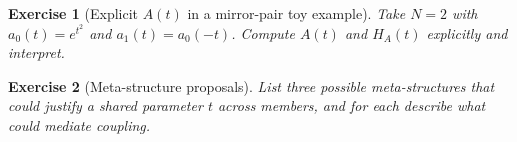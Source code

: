 \documentclass[11pt]{article}
\newtheorem{exercise}{Exercise}
\begin{document}
\begin{exercise}[Explicit $A(t)$ in a mirror-pair toy example]
Take $N=2$ with $a_0(t)=e^{t^2}$ and $a_1(t)=a_0(-t)$. Compute $A(t)$ and $H_A(t)$ explicitly and interpret.
\end{exercise}

\begin{exercise}[Meta-structure proposals]
List three possible meta-structures that could justify a shared parameter $t$ across members, and for each describe what could mediate coupling.
\end{exercise}



\clearpage
\end{document}
